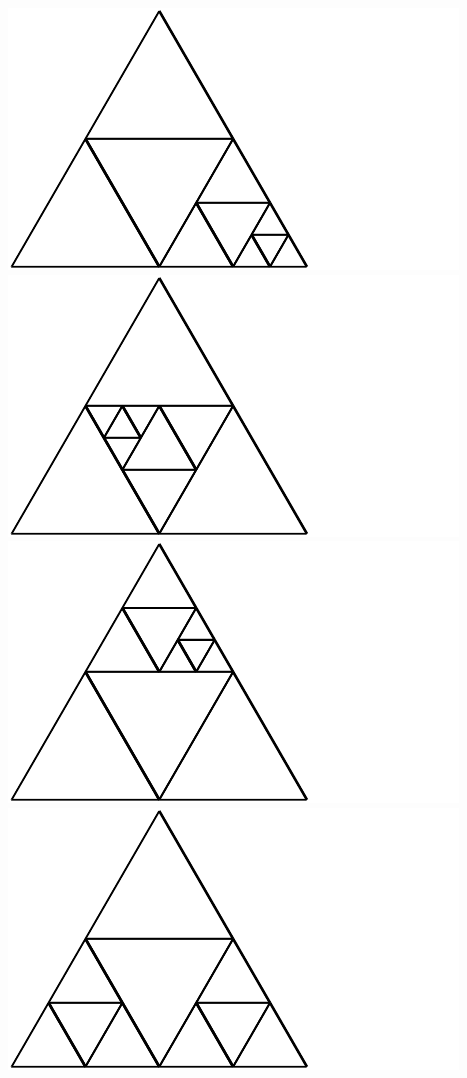 \documentclass[12pt,amstags,fleqn]{article}
\theoremstyle{plain}
\theoremstyle{definition}
\begin{document}
\includegraphics{output-dissections-dissection10_i25_r0_c0.pdf}
\includegraphics{output-dissections-dissection10_i25_r1_c0.pdf}
\includegraphics{output-dissections-dissection10_i25_r1_c3.pdf}
\includegraphics{output-dissections-dissection10_i26_r0_c3.pdf}
\end{document}

